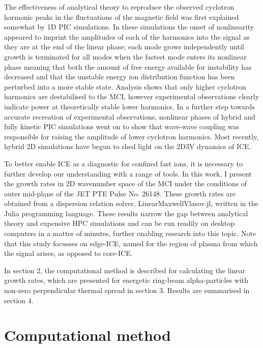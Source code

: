 \documentclass[12pt]{iopart}
\begin{document}
The effectiveness of analytical theory to reproduce the observed cyclotron
harmonic peaks in the fluctuations of the magnetic field was first explained
somewhat by 1D PIC simulations. In these simulations the onset of nonlinearity
appeared to imprint the amplitudes of each of the harmonics into the signal as
they are at the end of the linear phase; each mode grows independently until 
growth is terminated for all modes when the fastest mode enters its nonlinear
phase meaning that both the amount of free energy available for instability has
decreased and that the unstable energy ion distribution function has been
perturbed into a more stable state. Analysis shows that only higher cyclotron
harmonics are destabilised\cite{McClements2015} to the MCI, however experimental
observations clearly indicate power at theoretically stable lower
harmonics\cite{Cottrell1988}. In a further step towards accurate recreation of
experimental observations, nonlinear phases of hybrid\cite{Carbajal2014} and
fully kinetic\cite{Cook2013,Chapman2017} PIC simulations went on to show that
wave-wave coupling was responsible for raising the amplitude of lower cyclotron
harmonics. Most recently, hybrid 2D simulations have begun to shed light on the
2D3V dynamics of ICE\cite{Carbajal2021}.

To better enable ICE as a diagnostic for confined fast ions, it is necessary to
further develop our understanding with a range of tools. In this work, I present
the growth rates in 2D wavenumber space of the MCI under the conditions of
outer mid-plane of the JET PTE\cite{Cottrell1993} Pulse No. 26148. These growth
rates are obtained from a dispersion relation solver,
LinearMaxwellVlasov.jl\cite{LinearMaxwellVlasov.jl}, written in the Julia programming
language\cite{Bezanson2017}. These results narrow the gap between analytical
theory and expensive HPC simulations and can be run readily on desktop computers
in a matter of minutes, further enabling research into this topic. Note that
this study focusses on edge-ICE, named for the region of plasma from which the signal
arises, as opposed to core-ICE\cite{Ochoukov2018}.

In section 2, the computational method is described for calculating the linear growth rates, which are presented for energetic ring-beam alpha-particles with non-zero perpendicular thermal spread in section 3. Results are summarised in section 4.

\section{Computational method}
\end{document}

